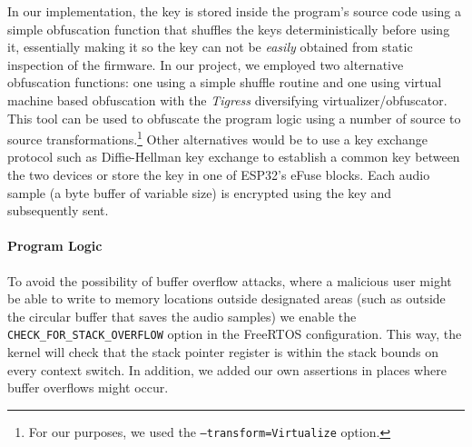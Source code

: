 \documentclass[conference]{IEEEtran}
\begin{document}
In our implementation, the key is stored inside the program's source code using 
a simple obfuscation function that shuffles the keys deterministically before using it, essentially
making it so the key can not be \textit{easily} obtained from static inspection of the firmware.
In our project, we employed two alternative obfuscation functions: one 
using a simple shuffle routine and one using
virtual machine based obfuscation\cite{VMObfuscation} with the \textit{Tigress}\cite{Tigress} diversifying virtualizer/obfuscator.
This tool can be used to obfuscate the program logic using 
a number of source to source transformations.\footnote{For our purposes, we used the \texttt{--transform=Virtualize} option.}
Other alternatives would be to use a key exchange protocol such as Diffie-Hellman key exchange\cite{DiffieHellmanKeyExchange} to 
establish a common key between the two devices or store the key in one of ESP32's eFuse blocks.
Each audio sample (a byte buffer of variable size) is encrypted using the key 
and subsequently sent.

\paragraph{Program Logic}

To avoid the possibility of buffer overflow attacks, where a malicious user might be able 
to write to memory locations outside designated areas (such as outside the circular buffer that saves
the audio samples) we enable the \texttt{CHECK\_FOR\_STACK\_OVERFLOW} option in the FreeRTOS configuration.
This way, the kernel will check that the stack pointer register is within the stack bounds on every context switch.
In addition, we added our own assertions in places where buffer overflows might occur.
\end{document}
